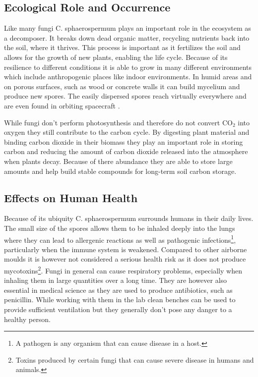 \subsection{Ecological Role and Occurrence}
Like many fungi C. sphaerospermum plays an important role in the ecosystem as a decomposer. It breaks down dead organic matter, recycling nutrients back into the soil, where it thrives. This process is important as it fertilizes the soil and allows for the growth of new plants, enabling the life cycle. Because of its resilience to different conditions it is able to grow in many different environments which include anthropogenic places like indoor environments. In humid areas and on porous surfaces, such as wood or concrete walls it can build mycelium and produce new spores. The easily dispersed spores reach virtually everywhere and are even found in orbiting spacecraft \cite{radiation}.

While fungi don't perform photosynthesis and therefore do not convert CO$_2$ into oxygen they still contribute to the carbon cycle. By digesting plant material and binding carbon dioxide in their biomass they play an important role in storing carbon and reducing the amount of carbon dioxide released into the atmosphere when plants decay. Because of there abundance they are able to store large amounts and help build stable compounds for long-term soil carbon storage.


\subsection{Effects on Human Health}
Because of its ubiquity C. sphaerospermum surrounds humans in their daily lives. The small size of the spores allows them to be inhaled deeply into the lungs where they can lead to allergenic reactions as well as pathogenic infections\footnote{A pathogen is any organism that can cause disease in a host.}, particularly when the immune system is weakened. Compared to other airborne moulds it is however not considered a serious health risk as it does not produce mycotoxins\footnote{Toxins produced by certain fungi that can cause severe disease in humans and animals.}. Fungi in general can cause respiratory problems, especially when inhaling them in large quantities over a long time. They are however also essential in medical science as they are used to produce antibiotics, such as penicillin. While working with them in the lab clean benches can be used to provide sufficient ventilation but they generally don't pose any danger to a healthy person.

